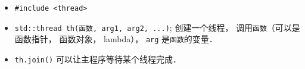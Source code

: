 
\begin{itemize}
\item \verb|#include <thread>|
\item \verb|std::thread th(函数, arg1, arg2, ...)|; 创建一个线程， 调用\verb|函数|（可以是函数指针， 函数对象， lambda）， \verb|arg| 是\verb|函数|的变量．
\item \verb|th.join()| 可以让主程序等待某个线程完成．
\end{itemize}

